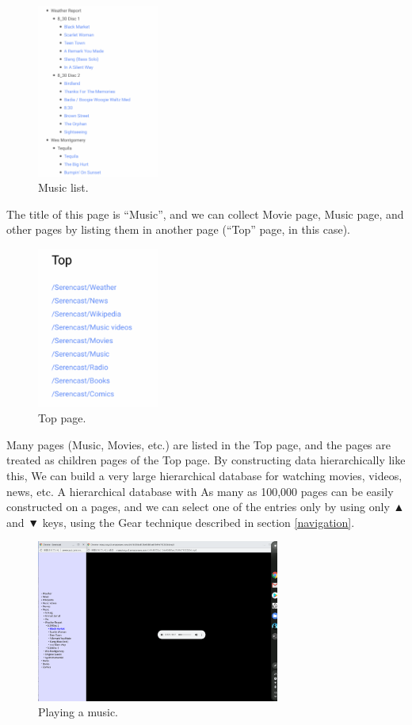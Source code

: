 \documentclass{article}
\def\up{▲}
\def\down{▼}
\def\SB{\tsf{Scrapbox}}
\begin{document}
\begin{figure}[H]
\centerline{\includegraphics[width=40mm,bb=0 0 652 926]{figures/d8fe8ff8f3e1bbcb34cf51e268592f8c.png}}
\caption{Music list.}
\label{musiclist}
\end{figure}

The title of this {\SB} page is ``Music'', and 
we can collect Movie page, Music page, and other pages by
listing them in another page (``Top'' page, in this case).

\begin{figure}[H]
\centerline{\includegraphics[width=40mm,bb=0 0 396 523]{figures/8a8e4d63b75183f1b4d0ed4db733f500.png}}
\caption{Top page.}
\label{top}
\end{figure}

Many pages (Music, Movies, etc.) are listed in the Top page, and
the pages are treated as children pages of the Top page.
By constructing data hierarchically like this,
We can build a very large hierarchical database for watching movies, videos, news, etc.
A hierarchical database with
As many as 100,000 pages can be easily constructed on a {\SB} pages, and
we can select one of the entries only by using only {\up} and {\down} keys,
using the Gear technique described in section \ref{navigation}.

\begin{figure}[H]
\centerline{\includegraphics[width=80mm,bb=0 0 2400 1600]{figures/blackmarket.png}}
\caption{Playing a music.}
\label{blackmarket}
\end{figure}
\end{document}
